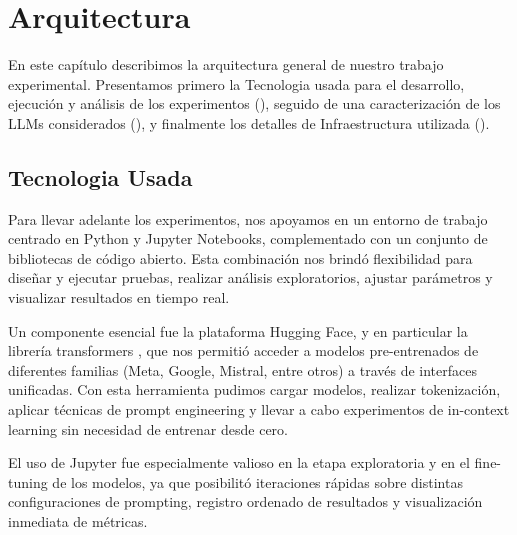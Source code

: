 \section{Arquitectura}\label{sec:Arquitectura}
En este capítulo describimos la arquitectura general de nuestro trabajo experimental. Presentamos primero la Tecnologia usada para el desarrollo, ejecución y análisis de los experimentos (), seguido de una caracterización de los LLMs considerados (), y finalmente los detalles de Infraestructura utilizada ().

\subsection{Tecnologia Usada}\label{subsec:stack}
Para llevar adelante los experimentos, nos apoyamos en un entorno de trabajo centrado en Python y Jupyter Notebooks, complementado con un conjunto de bibliotecas de código abierto. Esta combinación nos brindó flexibilidad para diseñar y ejecutar pruebas, realizar análisis exploratorios, ajustar parámetros y visualizar resultados en tiempo real.

Un componente esencial fue la plataforma Hugging Face, y en particular la librería transformers \cite{transformers}, que nos permitió acceder a modelos pre-entrenados de diferentes familias (Meta, Google, Mistral, entre otros) a través de interfaces unificadas. Con esta herramienta pudimos cargar modelos, realizar tokenización, aplicar técnicas de prompt engineering y llevar a cabo experimentos de in-context learning sin necesidad de entrenar desde cero.

El uso de Jupyter fue especialmente valioso en la etapa exploratoria y en el fine-tuning de los modelos, ya que posibilitó iteraciones rápidas sobre distintas configuraciones de prompting, registro ordenado de resultados y visualización inmediata de métricas.

